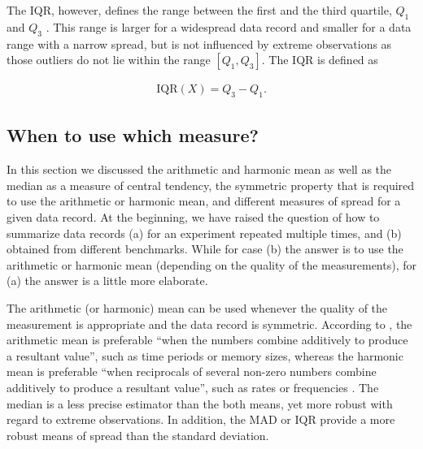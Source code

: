 The IQR, however, defines the range between the first and the third quartile,
$Q_1$ and $Q_3$ \citep{shanmugam_statistics_2015}. This range is larger for a
widespread data record and smaller for a data range with a narrow spread, but is not influenced by extreme
observations as those outliers do not lie within the range $\left[ Q_1,Q_3
\right] $. The IQR is defined as 

\begin{equation} \label{eq:iqr}
\begin{split}
\mathrm{IQR}(X) = Q_3 - Q_1.
\end{split}
\end{equation}

\subsection{When to use which measure?}
In this section we discussed the arithmetic and harmonic mean as well as the
median as a measure of central tendency, the symmetric property that is
required to use the arithmetic or harmonic mean, and different measures of
spread for a given data record. At the beginning, we have raised the question of how to
summarize data records (a) for an experiment repeated multiple times, and (b)
obtained from different benchmarks. While for case (b) the answer is to use the
arithmetic or harmonic mean (depending on the quality of the measurements), for
(a) the answer is a little more elaborate.

The arithmetic (or harmonic) mean can be used whenever the quality of the
measurement is appropriate and the data record is symmetric. According to
\cite{shanmugam_statistics_2015}, the arithmetic mean is preferable ``when the numbers combine
additively to produce a resultant value'', such as time periods or memory sizes, whereas
the harmonic mean is preferable ``when reciprocals of several non-zero numbers
combine additively to produce a resultant value'', such as rates or frequencies
\citep{smith_characterizing_1988}.
The median is a less precise estimator than the both means, yet more robust
with regard to extreme observations. In addition, the MAD or IQR provide a more
robust means of spread than the standard deviation.

